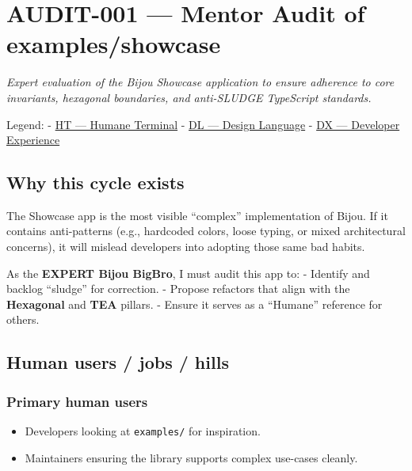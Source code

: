 \chapter{AUDIT-001 --- Mentor Audit of examples/showcase}\label{record-252}

\smallskip

\emph{Expert evaluation of the Bijou Showcase application to ensure adherence to core invariants, hexagonal boundaries, and anti-SLUDGE TypeScript standards.}

Legend: - \href{https://github.com/flyingrobots/bijou/blob/cbd70612140e7a450d764b3c7be1c6af878b99bc/legends/HT-humane-terminal.md}{HT --- Humane Terminal} - \href{https://github.com/flyingrobots/bijou/blob/cbd70612140e7a450d764b3c7be1c6af878b99bc/legends/DL-design-language.md}{DL --- Design Language} - \href{https://github.com/flyingrobots/bijou/blob/cbd70612140e7a450d764b3c7be1c6af878b99bc/legends/DX-developer-experience.md}{DX --- Developer Experience}

\section{Why this cycle exists}\label{record-252-why-this-cycle-exists}

The Showcase app is the most visible ``complex'' implementation of Bijou. If it contains anti-patterns (e.g., hardcoded colors, loose typing, or mixed architectural concerns), it will mislead developers into adopting those same bad habits.

As the \textbf{EXPERT Bijou BigBro}, I must audit this app to: - Identify and backlog ``sludge'' for correction. - Propose refactors that align with the \textbf{Hexagonal} and \textbf{TEA} pillars. - Ensure it serves as a ``Humane'' reference for others.

\section{Human users / jobs / hills}\label{record-252-human-users-jobs-hills}

\subsection{Primary human users}\label{record-252-primary-human-users}

\begin{itemize}
\tightlist
\item
  Developers looking at \texttt{e\allowbreak{}x\allowbreak{}a\allowbreak{}m\allowbreak{}p\allowbreak{}l\allowbreak{}e\allowbreak{}s\allowbreak{}/} for inspiration.
\item
  Maintainers ensuring the library supports complex use-cases cleanly.
\end{itemize}

